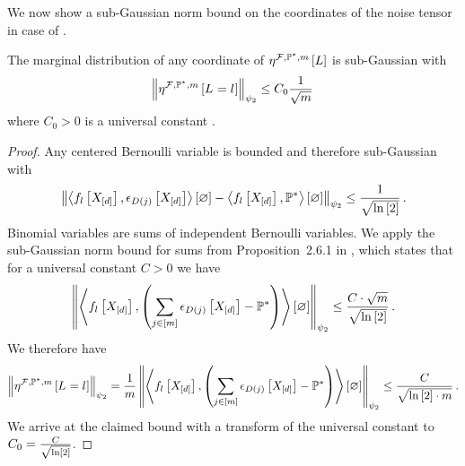 
We now show a sub-Gaussian norm bound on the coordinates of the noise tensor in case of \HybridLogicNetworks{}.

\begin{lemma}
    \label{lem:mlnMeanSubGaussianCoordinates}
    The marginal distribution of any coordinate of $\eta^{\mathcal{F},\mathbb{P}^*,m}\left[L\right]$ is sub-Gaussian with
    \begin{align*}
        \left\|\eta^{\mathcal{F},\mathbb{P}^*,m}\left[L_{}=l_{}\right]\right\|_{\psi_2} \leq C_0 \frac{1}{\sqrt{m}} \,
    \end{align*}
    where $C_0>0$ is a universal constant .
\end{lemma}
\begin{proof}
    Any centered Bernoulli variable is bounded and therefore sub-Gaussian with
    \begin{align*}
        \left\|\left\langle f_{l}\left[X_{[d]}\right],\epsilon_{D(j)}\left[X_{[d]}\right]\right\rangle \left[ \varnothing \right]-\left\langle f_{l}\left[X_{[d]}\right],\mathbb{P}^*\right\rangle \left[ \varnothing \right]\right\|_{\psi_2}
        \leq \frac{1}{\sqrt{\ln \left[ 2 \right]}} \, .
    \end{align*}
    Binomial variables are sums of independent Bernoulli variables.
    We apply the sub-Gaussian norm bound for sums from Proposition~2.6.1 in \cite{vershynin_high-dimensional_2018}, which states that for a universal constant $C>0$ we have
    \begin{align*}
        \left\|\left\langle f_{l}\left[X_{[d]}\right],\left(\sum_{j\in[m]}\epsilon_{D(j)}\left[X_{[d]}\right] - \mathbb{P}^*\right)\right\rangle \left[ \varnothing \right]\right\|_{\psi_2}
        \leq \frac{C\cdot\sqrt{m}}{\sqrt{\ln \left[ 2 \right]}} \, .
    \end{align*}
    We therefore have
    \begin{align*}
        \left\|\eta^{\mathcal{F},\mathbb{P}^*,m}\left[L_{}=l_{}\right]\right\|_{\psi_2} =
        \frac{1}{m}\left\|\left\langle f_{l}\left[X_{[d]}\right],\left(\sum_{j\in[m]}\epsilon_{D(j)}\left[X_{[d]}\right] - \mathbb{P}^*\right)\right\rangle \left[ \varnothing \right]\right\|_{\psi_2}
        \leq \frac{C}{\sqrt{\ln \left[ 2 \right] \cdot m}} \, .
    \end{align*}
    We arrive at the claimed bound with a transform of the universal constant to $C_0=\frac{C}{\sqrt{\ln \left[ 2 \right]}}$.
\end{proof}

